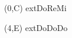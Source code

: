 \documentclass[preview]{standalone}
\begin{document}
\begin{center}
(0,C) \mapsto	ext{DoReMi}

(4,E) \mapsto	ext{DoDoDo}
\end{center}
\end{document}
